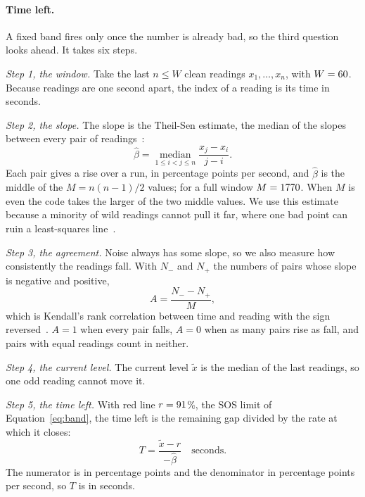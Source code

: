 \paragraph{Time left.}
A fixed band fires only once the number is already bad, so the third question looks ahead. It takes six steps.

\emph{Step 1, the window.} Take the last $n \le W$ clean readings $x_1, \dots, x_n$, with $W = 60$. Because readings are one second apart, the index of a reading is its time in seconds.

\emph{Step 2, the slope.} The slope is the Theil-Sen estimate, the median of the slopes between every pair of readings~\cite{theil1950,sen1968}:
\begin{equation}\label{eq:theilsen}
  \hat\beta = \operatorname*{median}_{1 \le i<j \le n} \frac{x_j - x_i}{j - i}.
\end{equation}
Each pair gives a rise over a run, in percentage points per second, and $\hat\beta$ is the middle of the $M = n(n-1)/2$ values; for a full window $M = 1770$. When $M$ is even the code takes the larger of the two middle values. We use this estimate because a minority of wild readings cannot pull it far, where one bad point can ruin a least-squares line~\cite{rousseeuw1987}.

\emph{Step 3, the agreement.} Noise always has some slope, so we also measure how consistently the readings fall. With $N_-$ and $N_+$ the numbers of pairs whose slope is negative and positive,
\begin{equation}\label{eq:agreement}
  A = \frac{N_- - N_+}{M},
\end{equation}
which is Kendall's rank correlation between time and reading with the sign reversed~\cite{kendall1938}. $A = 1$ when every pair falls, $A = 0$ when as many pairs rise as fall, and pairs with equal readings count in neither.

\emph{Step 4, the current level.} The current level $\tilde x$ is the median of the last \numNowMedianN{} readings, so one odd reading cannot move it.

\emph{Step 5, the time left.} With red line $r = 91$\%, the SOS limit of Equation~\ref{eq:band}, the time left is the remaining gap divided by the rate at which it closes:
\begin{equation}\label{eq:timeleft}
  T = \frac{\tilde x - r}{-\hat\beta}\quad\text{seconds}.
\end{equation}
The numerator is in percentage points and the denominator in percentage points per second, so $T$ is in seconds.

